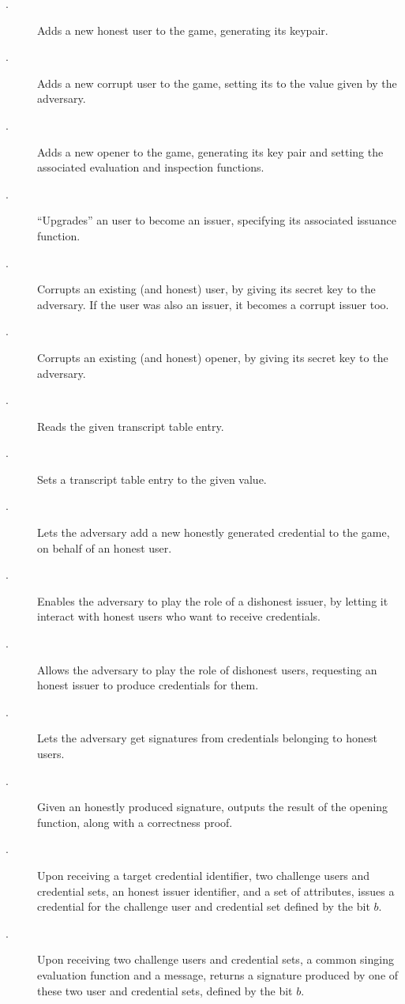 \begin{description}
\item[\HUGEN.] Adds a new honest user to the game, generating its keypair.
\item[\HUGEN.] Adds a new corrupt user to the game, setting its \upk to the
  value given by the adversary.  
\item[\OGEN.] Adds a new opener to the game, generating its key pair and
  setting the associated evaluation and inspection functions.
\item[\ISET.] ``Upgrades'' an user to become an issuer, specifying its
  associated issuance function.
\item[\UCORR.] Corrupts an existing (and honest) user, by giving its secret
  key to the adversary. If the user was also an issuer, it becomes a corrupt
  issuer too.
\item[\OCORR.] Corrupts an existing (and honest) opener, by giving its secret
  key to the adversary.
\item[\RREG.] Reads the given transcript table entry.
\item[\WREG.] Sets a transcript table entry to the given value.
\item[\OBTISS.] Lets the adversary add a new honestly generated credential to
  the game, on behalf of an honest user.
\item[\OBTAIN.] Enables the adversary to play the role of a dishonest issuer, by
  letting it interact with honest users who want to receive credentials.
\item[\ISSUE.] Allows the adversary to play the role of dishonest users,
  requesting an honest issuer to produce credentials for them.
\item[\SIGN.] Lets the adversary get signatures from credentials belonging
  to honest users.
\item[\OPEN.] Given an honestly produced signature, outputs the result of the
  opening function, along with a correctness proof.
\item[\OBTCHALb.] Upon receiving a target credential identifier, two challenge
  users and credential sets, an honest issuer identifier, and a set of
  attributes, issues a credential for the challenge user and credential set
  defined by the bit $b$. 
\item[\CHALb.] Upon receiving two challenge users and credential sets, a common
  singing evaluation function and a message, returns a signature produced by one
  of these two user and credential sets, defined by the bit $b$.
\end{description}

